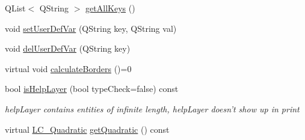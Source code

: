\begin{DoxyCompactItemize}
Q\-List$<$ Q\-String $>$ \hyperlink{classRS__Entity_af63f9426d378f49bde2b5d1011c24606}{get\-All\-Keys} ()
\item 
void \hyperlink{classRS__Entity_a2a217b7c3cfbc6361b1fdeea2ebb93a6}{set\-User\-Def\-Var} (Q\-String key, Q\-String val)
\item 
void \hyperlink{classRS__Entity_a0397257f0c0e39ebbab516c4409c085b}{del\-User\-Def\-Var} (Q\-String key)
\item 
virtual void \hyperlink{classRS__Entity_a9544c0202aaf06d508068b20459f3df5}{calculate\-Borders} ()=0
\item 
bool \hyperlink{classRS__Entity_a99d682e256590506b046f966e1df8655}{is\-Help\-Layer} (bool type\-Check=false) const 
\begin{DoxyCompactList}\small\item\em help\-Layer contains entities of infinite length, help\-Layer doesn't show up in print \end{DoxyCompactList}\item 
virtual \hyperlink{classLC__Quadratic}{L\-C\-\_\-\-Quadratic} \hyperlink{classRS__Entity_af50c1a1c6c5f8f9108cad88c125e5f50}{get\-Quadratic} () const 
\end{DoxyCompactItemize}
